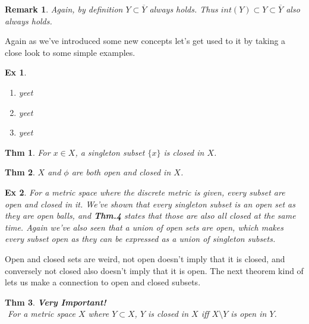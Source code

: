 \documentclass[paper=a4, fontsize=11pt]{scrartcl}
\newtheorem{theorem}{Thm}
\newtheorem{example}{Ex}
\newtheorem*{remark}{Remark}
\begin{document}
\begin{remark}
	Again, by definition $Y \subset \overline{Y}$ always holds. Thus $int(Y)\subset Y\subset \overline{Y}$ also always holds.
\end{remark}

Again as we've introduced some new concepts let's get used to it by taking a close look to some simple examples.\\
\begin{example}
$ $ \newline
\vspace{-0.15in}
\begin{enumerate}[label=\arabic*)]
	\item yeet
	\item yeet
	\item yeet\\
\end{enumerate}
\end{example}

\begin{theorem}
	For $x \in X$, a singleton subset $\{x\}$ is closed in $X$.\\
\end{theorem}

\begin{theorem}
	 $X$ and $\phi$ are both open and closed in $X$.\\
\end{theorem}

\begin{example}
	For a metric space where the discrete metric is given, every subset are open and closed in it. We've shown that every singleton subset is an open set as they are open balls, and \textbf{Thm.4} states that those are also all closed at the same time. Again we've also seen that a union of open sets are open, which makes every subset open as they can be expressed as a union of singleton subsets. \\
\end{example}

Open and closed sets are weird, not open doesn't imply that it is closed, and conversely not closed also doesn't imply that it is open. The next theorem kind of lets us make a connection to open and closed subsets.\\

\begin{theorem}
\textbf{Very Important!} \\
$ $ \newline 
 For a metric space $X$ where $Y \subset X$, $Y$ is closed in $X$ iff $X\setminus Y$ is open in $Y$.\\
\end{theorem}
\end{document}
